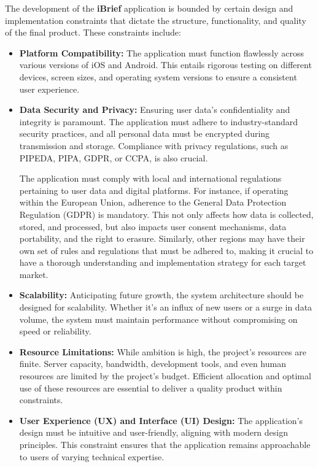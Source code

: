 The development of the \textbf{iBrief} application is bounded by certain design and implementation constraints that dictate the structure, functionality, and quality of the final product. These constraints include:

\begin{itemize}
    \item \textbf{Platform Compatibility:} The application must function flawlessly across various versions of \gls{iOS} and \gls{Android}. This entails rigorous testing on different devices, screen sizes, and operating system versions to ensure a consistent user experience.
    
    \item \textbf{Data Security and Privacy:} Ensuring user data's confidentiality and integrity is paramount. The application must adhere to industry-standard security practices, and all personal data must be encrypted during transmission and storage. Compliance with privacy regulations, such as \gls{PIPEDA}, \gls{PIPA}, \gls{GDPR}, or \gls{CCPA}, is also crucial. 
    
    The application must comply with local and international regulations pertaining to user data and digital platforms. For instance, if operating within the European Union, adherence to the General Data Protection Regulation (\gls{GDPR}) is mandatory. This not only affects how data is collected, stored, and processed, but also impacts user consent mechanisms, data portability, and the right to erasure. Similarly, other regions may have their own set of rules and regulations that must be adhered to, making it crucial to have a thorough understanding and implementation strategy for each target market.
    
    \item \textbf{Scalability:} Anticipating future growth, the system architecture should be designed for scalability. Whether it's an influx of new users or a surge in data volume, the system must maintain performance without compromising on speed or reliability.
    
    \item \textbf{Resource Limitations:} While ambition is high, the project's resources are finite. Server capacity, bandwidth, development tools, and even human resources are limited by the project's budget. Efficient allocation and optimal use of these resources are essential to deliver a quality product within constraints.
    
    \item \textbf{User Experience (UX) and Interface (UI) Design:} The application's design must be intuitive and user-friendly, aligning with modern design principles. This constraint ensures that the application remains approachable to users of varying technical expertise.
    

\end{itemize}
